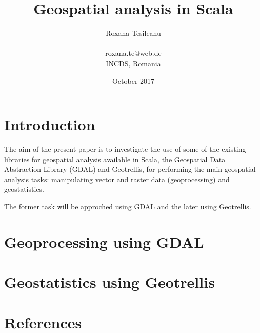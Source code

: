 \documentclass {article}
\title {Geospatial analysis in Scala}
\date {October 2017}
\author {Roxana Tesileanu \\
\\
roxana.te@web.de \\
INCDS, Romania}
\begin{document}
	\maketitle

\tableofcontents

\section {Introduction}

The aim of the present paper is to investigate the use of some of the existing libraries for geospatial analysis available in Scala, the Geospatial Data Abstraction Library (GDAL) and Geotrellis, for performing the main geospatial analysis tasks: manipulating vector and raster data (geoprocessing) and geostatistics.

The former task will be approched using GDAL and the later using Geotrellis.  

\section {Geoprocessing using GDAL}

\section {Geostatistics using Geotrellis}

\section* {References}
\end{document}
